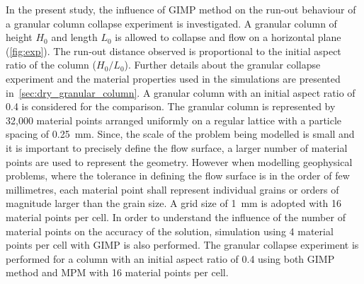 In the present study, the influence of GIMP method on the run-out behaviour of 
a granular column collapse experiment is investigated. A granular column of 
height $H_0$ and length $L_0$ is allowed to collapse and flow on a horizontal 
plane (\cref{fig:exp}). The run-out distance observed is proportional to the 
initial aspect ratio of the column ($H_0/L_0$). Further details about the 
granular collapse experiment and the material properties used in the 
simulations are presented in~\cref{sec:dry_granular_column}. A 
granular column with an initial aspect ratio of 0.4 is considered for the 
comparison. The granular column is represented by 32,000 material points 
arranged uniformly on a regular lattice with a particle spacing of 
0.25~\si{\mm}. Since, the scale of the problem being modelled is small and it 
is important to precisely define the flow surface, a larger number 
of material points are used to represent the geometry. However when modelling 
geophysical problems, where the tolerance in defining the flow surface is in 
the order of few millimetres, each material point 
shall represent individual grains or orders of magnitude larger than the grain 
size. A grid size of 1~\si{mm} is adopted with 16 material points per 
cell. In order to understand the influence of the number of material points on 
the accuracy of the solution, simulation using 4 material points per cell with 
GIMP is also performed. The granular collapse experiment is performed for a 
column with an initial aspect ratio of 0.4 using both GIMP method and MPM with 
16 material points per cell. 

